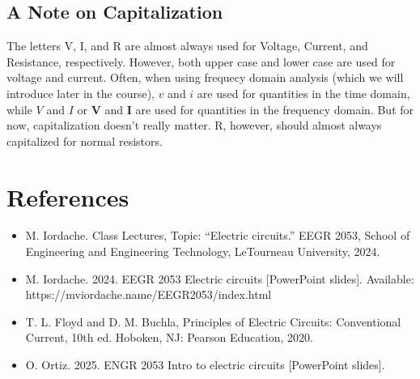 \documentclass{article}
\begin{document}
\subsection{A Note on Capitalization}
The letters V, I, and R are almost always used for Voltage, Current, and Resistance, respectively. However, both upper case and lower case are used for voltage and current. Often, when using frequecy domain analysis (which we will introduce later in the course), $v$ and $i$ are used for quantities in the time domain, while $V$ and $I$ or $\textbf{V}$ and $\textbf{I}$ are used for quantities in the frequency domain. But for now, capitalization doesn't really matter. R, however, should almost always capitalized for normal resistors.

\newpage
\section*{References}
\begin{itemize}
\item M. Iordache. Class Lectures, Topic: ``Electric circuits.'' EEGR 2053, School of Engineering and Engineering Technology, LeTourneau University, 2024.
\item M. Iordache. 2024. EEGR 2053 Electric circuits [PowerPoint slides]. Available: \\ https://mviordache.name/EEGR2053/index.html
\item T. L. Floyd and D. M. Buchla, Principles of Electric Circuits: Conventional Current, 10th ed. Hoboken, NJ: Pearson Education, 2020.
\item O. Ortiz. 2025. ENGR 2053 Intro to electric circuits [PowerPoint slides].
\end{itemize}
\end{document}
